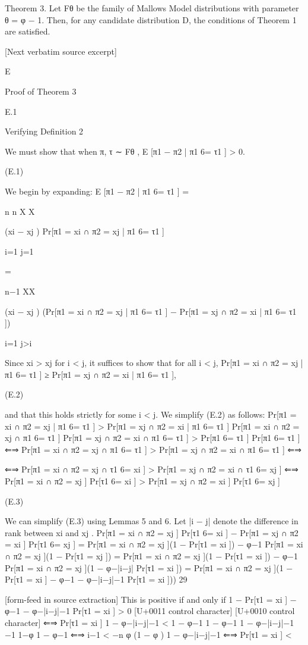 \documentclass[10pt]{article}
\begin{document}
\begin{ReviewVerbatim}
Theorem 3. Let Fθ be the family of Mallows Model distributions with parameter θ = φ − 1. Then, for any
candidate distribution D, the conditions of Theorem 1 are satisfied.

[Next verbatim source excerpt]

E

Proof of Theorem 3

E.1

Verifying Definition 2

We must show that when π, τ ∼ Fθ ,
E [π1 − π2 | π1 6= τ1 ] > 0.

(E.1)

We begin by expanding:
E [π1 − π2 | π1 6= τ1 ] =

n
n X
X

(xi − xj ) Pr[π1 = xi ∩ π2 = xj | π1 6= τ1 ]

i=1 j=1

=

n−1
XX

(xi − xj ) (Pr[π1 = xi ∩ π2 = xj | π1 6= τ1 ] − Pr[π1 = xj ∩ π2 = xi | π1 6= τ1 ])

i=1 j>i

Since xi > xj for i < j, it suffices to show that for all i < j,
Pr[π1 = xi ∩ π2 = xj | π1 6= τ1 ] ≥ Pr[π1 = xj ∩ π2 = xi | π1 6= τ1 ],

(E.2)

and that this holds strictly for some i < j. We simplify (E.2) as follows:
Pr[π1 = xi ∩ π2 = xj | π1 6= τ1 ] > Pr[π1 = xj ∩ π2 = xi | π1 6= τ1 ]
Pr[π1 = xi ∩ π2 = xj ∩ π1 6= τ1 ]
Pr[π1 = xj ∩ π2 = xi ∩ π1 6= τ1 ]
>
Pr[π1 6= τ1 ]
Pr[π1 6= τ1 ]
⇐⇒ Pr[π1 = xi ∩ π2 = xj ∩ π1 6= τ1 ] > Pr[π1 = xj ∩ π2 = xi ∩ π1 6= τ1 ]
⇐⇒

⇐⇒ Pr[π1 = xi ∩ π2 = xj ∩ τ1 6= xi ] > Pr[π1 = xj ∩ π2 = xi ∩ τ1 6= xj ]
⇐⇒ Pr[π1 = xi ∩ π2 = xj ] Pr[τ1 6= xi ] > Pr[π1 = xj ∩ π2 = xi ] Pr[τ1 6= xj ]

(E.3)

We can simplify (E.3) using Lemmas 5 and 6. Let |i − j| denote the difference in rank between xi and xj .
Pr[π1 = xi ∩ π2 = xj ] Pr[τ1 6= xi ] − Pr[π1 = xj ∩ π2 = xi ] Pr[τ1 6= xj ]
= Pr[π1 = xi ∩ π2 = xj ](1 − Pr[τ1 = xi ]) − φ−1 Pr[π1 = xi ∩ π2 = xj ](1 − Pr[τ1 = xj ])
= Pr[π1 = xi ∩ π2 = xj ](1 − Pr[τ1 = xi ]) − φ−1 Pr[π1 = xi ∩ π2 = xj ](1 − φ−|i−j| Pr[τ1 = xi ])
= Pr[π1 = xi ∩ π2 = xj ](1 − Pr[τ1 = xi ] − φ−1 − φ−|i−j|−1 Pr[τ1 = xi ]))
29


[form-feed in source extraction]
This is positive if and only if
1 − Pr[τ1 = xi ] − φ−1 − φ−|i−j|−1 Pr[τ1 = xi ] > 0
[U+0011 control character]
[U+0010 control character]
⇐⇒ Pr[τ1 = xi ] 1 − φ−|i−j|−1 < 1 − φ−1
1 − φ−1
1 − φ−|i−j|−1
−1
1−φ
1 − φ−1
⇐⇒ i−1
<
−n
φ (1 − φ )
1 − φ−|i−j|−1
⇐⇒ Pr[τ1 = xi ] <


\end{ReviewVerbatim}
\end{document}
